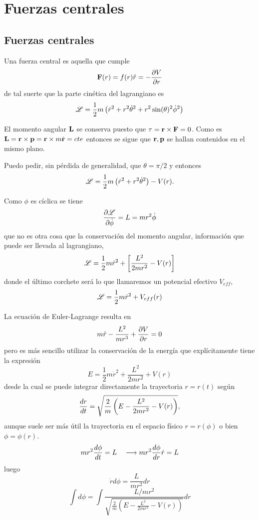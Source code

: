 \documentclass[10pt,oneside]{CBFT_book}
\begin{document}

\chapter{Fuerzas centrales}

\section{Fuerzas centrales}

Una fuerza central es aquella que cumple
\[
	\vb{F}(r) = f(r)\hat{r} = - \dpar{V}{r}
\]
de tal suerte que la parte cinética del lagrangiano es 
\[
	\mathscr{L} = \frac{1}{2}m \left( \dot{r}^2 + r^2 \dot{\theta}^2 + r^2 \sin(\theta)^2\dot{\phi}^2 \right)
\]

El momento angular $\vb{L}$ se conserva puesto que $\vb{\tau} = \vb{r} \times \vb{F}=0$. Como es 
$\vb{L} = \vb{r} \times \vb{p} = \vb{r} \times m\dot{\vb{r}} = cte$ entonces se sigue que $\vb{r},\vb{p}$
se hallan contenidos en el mismo plano.

Puedo pedir, sin pérdida de generalidad, que $\theta=\pi/2$ y entonces 
\[
	\mathscr{L} = \frac{1}{2}m \left( \dot{r}^2 + r^2 \dot{\theta}^2 \right) - V(r).
\]

Como $\phi$ es cíclica se tiene
\[
	\frac{\partial^{\hspace{-0.05em}} {\mathscr{L}}}{\partial {\dot{\phi}}^{\hspace{-0.05em}}} = L = mr^2\dot{\phi}
\]
que no es otra cosa que la conservación del momento angular, información que puede ser llevada al
lagrangiano,
\[
	\mathscr{L} = \frac{1}{2}m \dot{r}^2 + \left[ \frac{L^2}{2 m r^2} - V(r) \right]
\]
donde el último corchete será lo que llamaremos un potencial efectivo $V_{eff}$,
\[
	\mathscr{L} = \frac{1}{2}m \dot{r}^2 + V_{eff}(r)
\]

La ecuación de Euler-Lagrange resulta en
\[
	m\ddot{r} - \frac{L^2}{mr^3} + \frac{\partial^{\hspace{-0.05em}} {V}}{\partial {r}^{\hspace{-0.05em}}} = 0
\]
pero es más sencillo utilizar la conservación de la energía que explícitamente tiene la expresión
\[
	E = \frac{1}{2}m \dot{r}^2 + \frac{L^2}{2 m r^2} + V(r)
\]
desde la cual se puede integrar directamente la trayectoria $r=r(t)$ según
\[
	\frac{d^{\hspace{-0.05em}} {r}}{d {t}^{\hspace{-0.05em}}} = \sqrt{ \frac{2}{m}\left( E - \frac{L^2}{2 m r^2} - V(r) \right)},
\]
aunque suele ser más útil la trayectoria en el espacio físico $r=r(\phi)$ o bien $\phi=\phi(r)$.
\[
	m r^2 \frac{d^{\hspace{-0.05em}} {\phi}}{d {t}^{\hspace{-0.05em}}} = L \quad \longrightarrow m r^2 \frac{d^{\hspace{-0.05em}} {\phi}}{d {r}^{\hspace{-0.05em}}} \dot{r} = L
\]
luego
\[
	\dot{r} d\phi = \frac{L}{m r^2} dr
\]
\[
	\int d\phi = \int \frac{L/mr^2}{\sqrt{ \frac{2}{m}\left( E - \frac{L^2}{2 m r^2} - V(r) \right)}}dr
\]
\end{document}
